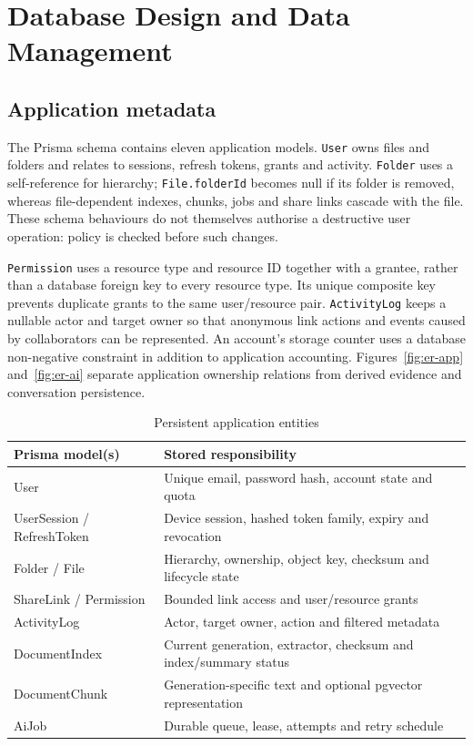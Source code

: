 \chapter{Database Design and Data Management}
\section{Application metadata}
The Prisma schema contains eleven application models. \texttt{User} owns files and folders and relates to sessions, refresh tokens, grants and activity. \texttt{Folder} uses a self-reference for hierarchy; \texttt{File.folderId} becomes null if its folder is removed, whereas file-dependent indexes, chunks, jobs and share links cascade with the file. These schema behaviours do not themselves authorise a destructive user operation: policy is checked before such changes.

\texttt{Permission} uses a resource type and resource ID together with a grantee, rather than a database foreign key to every resource type. Its unique composite key prevents duplicate grants to the same user/resource pair. \texttt{ActivityLog} keeps a nullable actor and target owner so that anonymous link actions and events caused by collaborators can be represented. An account's storage counter uses a database non-negative constraint in addition to application accounting.
Figures~\ref{fig:er-app} and~\ref{fig:er-ai} separate application ownership relations from derived evidence and conversation persistence.
\par\begin{table}[htbp]\caption{Persistent application entities}\small\begin{tabularx}{\linewidth}{p{.30\linewidth}Y}\toprule Prisma model(s)&Stored responsibility\\\midrule
User&Unique email, password hash, account state and quota\\
UserSession / RefreshToken&Device session, hashed token family, expiry and revocation\\
Folder / File&Hierarchy, ownership, object key, checksum and lifecycle state\\
ShareLink / Permission&Bounded link access and user/resource grants\\
ActivityLog&Actor, target owner, action and filtered metadata\\
DocumentIndex&Current generation, extractor, checksum and index/summary status\\
DocumentChunk&Generation-specific text and optional pgvector representation\\
AiJob&Durable queue, lease, attempts and retry schedule\\\bottomrule\end{tabularx}\end{table}\par
